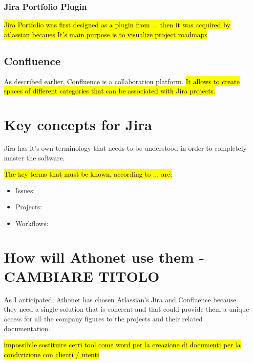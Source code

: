 		\subsubsection{Jira Portfolio Plugin}
			\hl{Jira Portfolio was first designed as a plugin from ... then it was acquired by atlassian becaues
			It's main purpose is to visualize project roadmaps}
		
	\subsection{Confluence}
		As described earlier, Confluence is a collaboration platform.
		\hl{It allows to create spaces of different categories that can be associated with Jira projects.}
		
		
\section{Key concepts for Jira}
	
	Jira has it's own terminology that needs to be understood in order to completely master the software.
	
	\hl{The key terms that must be known, according to ... are:}
	\begin{itemize}
		\item Issues: 
		\item Projects: 
		\item Workflows: 
	\end{itemize}
	
\section{How will Athonet use them - CAMBIARE TITOLO}

	As I anticipated, Athonet has chosen Atlassian's Jira and Confluence because they need a single solution that is coherent and that could provide them a unique access for all the company figures to the projects and their related documentation.
	
	\hl{impossibile sostituire certi tool come word per la creazione di documenti per la condivizione con clienti / utenti}

